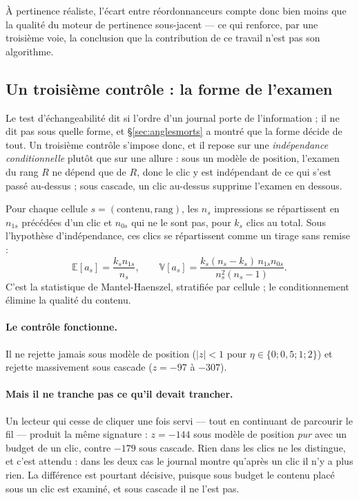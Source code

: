 \documentclass[11pt,a4paper]{article}
\begin{document}
À pertinence réaliste, l'écart entre réordonnanceurs compte donc bien moins que la qualité du
moteur de pertinence sous-jacent --- ce qui renforce, par une troisième voie, la conclusion que la
contribution de ce travail n'est pas son algorithme.


\subsection{Un troisième contrôle : la forme de l'examen}
\label{sec:testdeforme}

Le test d'échangeabilité dit si l'ordre d'un journal porte de l'information ; il ne dit pas sous
quelle forme, et \S\ref{sec:anglesmorts} a montré que la forme décide de tout. Un troisième
contrôle s'impose donc, et il repose sur une \emph{indépendance conditionnelle} plutôt que sur une
allure : sous un modèle de position, l'examen du rang $R$ ne dépend que de $R$, donc le clic y est
indépendant de ce qui s'est passé au-dessus ; sous cascade, un clic au-dessus supprime l'examen en
dessous.

Pour chaque cellule $s = (\text{contenu}, \text{rang})$, les $n_s$ impressions se répartissent en
$n_{1s}$ précédées d'un clic et $n_{0s}$ qui ne le sont pas, pour $k_s$ clics au total. Sous
l'hypothèse d'indépendance, ces clics se répartissent comme un tirage sans remise :
\begin{equation}
\mathbb{E}[a_s] = \frac{k_s n_{1s}}{n_s}, \qquad
\mathbb{V}[a_s] = \frac{k_s (n_s - k_s)\, n_{1s} n_{0s}}{n_s^2 (n_s - 1)} .
\label{eq:forme}
\end{equation}
C'est la statistique de Mantel-Haenszel, stratifiée par cellule ; le conditionnement élimine la
qualité du contenu.

\paragraph{Le contrôle fonctionne.} Il ne rejette jamais sous modèle de position ($|z| < 1$ pour
$\eta \in \{0 ; 0{,}5 ; 1 ; 2\}$) et rejette massivement sous cascade ($z = -97$ à $-307$).

\paragraph{Mais il ne tranche pas ce qu'il devait trancher.} Un lecteur qui cesse de cliquer une
fois servi --- tout en continuant de parcourir le fil --- produit la même signature : $z = -144$
sous modèle de position \emph{pur} avec un budget de un clic, contre $-179$ sous cascade. Rien
dans les clics ne les distingue, et c'est attendu : dans les deux cas le journal montre qu'après
un clic il n'y a plus rien. La différence est pourtant décisive, puisque sous budget le contenu
placé sous un clic est examiné, et sous cascade il ne l'est pas.
\end{document}
